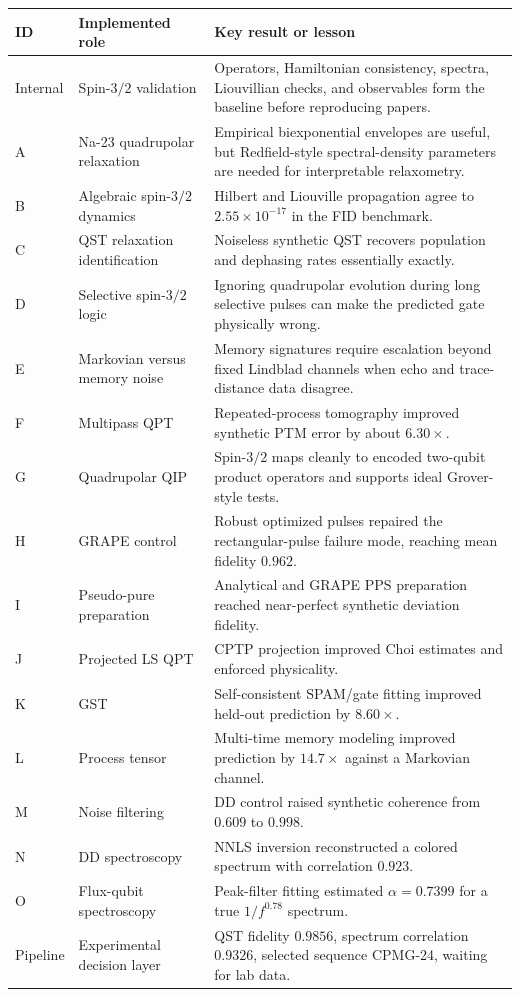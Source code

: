 \documentclass[11pt,a4paper]{article}
\begin{document}
\begin{longtable}{p{}p{}p{}}
\toprule
\textbf{ID} & \textbf{Implemented role} & \textbf{Key result or lesson}\\
\midrule
\endhead
Internal & Spin-$3/2$ validation & Operators, Hamiltonian consistency, spectra,
Liouvillian checks, and observables form the baseline before reproducing papers.\\
A & Na-23 quadrupolar relaxation & Empirical biexponential envelopes are useful,
but Redfield-style spectral-density parameters are needed for interpretable
relaxometry.\\
B & Algebraic spin-$3/2$ dynamics & Hilbert and Liouville propagation agree to
$2.55\times10^{-17}$ in the FID benchmark.\\
C & QST relaxation identification & Noiseless synthetic QST recovers population
and dephasing rates essentially exactly.\\
D & Selective spin-$3/2$ logic & Ignoring quadrupolar evolution during long
selective pulses can make the predicted gate physically wrong.\\
E & Markovian versus memory noise & Memory signatures require escalation beyond
fixed Lindblad channels when echo and trace-distance data disagree.\\
F & Multipass QPT & Repeated-process tomography improved synthetic PTM error by
about $6.30\times$.\\
G & Quadrupolar QIP & Spin-$3/2$ maps cleanly to encoded two-qubit product
operators and supports ideal Grover-style tests.\\
H & GRAPE control & Robust optimized pulses repaired the rectangular-pulse
failure mode, reaching mean fidelity $0.962$.\\
I & Pseudo-pure preparation & Analytical and GRAPE PPS preparation reached
near-perfect synthetic deviation fidelity.\\
J & Projected LS QPT & CPTP projection improved Choi estimates and enforced
physicality.\\
K & GST & Self-consistent SPAM/gate fitting improved held-out prediction by
$8.60\times$.\\
L & Process tensor & Multi-time memory modeling improved prediction by
$14.7\times$ against a Markovian channel.\\
M & Noise filtering & DD control raised synthetic coherence from $0.609$ to
$0.998$.\\
N & DD spectroscopy & NNLS inversion reconstructed a colored spectrum with
correlation $0.923$.\\
O & Flux-qubit spectroscopy & Peak-filter fitting estimated $\alpha=0.7399$
for a true $1/f^{0.78}$ spectrum.\\
Pipeline & Experimental decision layer & QST fidelity $0.9856$, spectrum
correlation $0.9326$, selected sequence CPMG-24, waiting for lab data.\\
\bottomrule
\end{longtable}
\end{document}
